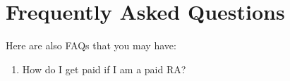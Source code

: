 \documentclass[
]{book}
\providecommand{\tightlist}{%
  \setlength{\itemsep}{0pt}\setlength{\parskip}{0pt}}
\begin{document}
\hypertarget{frequently-asked-questions}{%
\section{\texorpdfstring{\textbf{Frequently Asked Questions}}{Frequently Asked Questions}}\label{frequently-asked-questions}}

Here are also FAQs that you may have:

\begin{enumerate}
\def\labelenumi{\arabic{enumi}.}
\tightlist
\item
  How do I get paid if I am a paid RA?
\end{enumerate}

  
\end{document}
